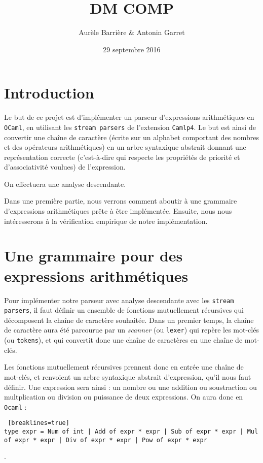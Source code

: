 \documentclass[11pt]{article}
\title{DM COMP}
\author{Aurèle Barrière \& Antonin Garret}
\date{29 septembre 2016}
\begin{document}
\maketitle

\section{Introduction}
Le but de ce projet est d'implémenter un parseur d'expressions arithmétiques en \texttt{OCaml}, en utilisant les \texttt{stream parsers} de l'extension \texttt{Camlp4}. Le but est ainsi de convertir une chaîne de caractère (écrite sur un alphabet comportant des nombres et des opérateurs arithmétiques) en un arbre syntaxique abstrait donnant une représentation correcte (c'est-à-dire qui respecte les propriétés de priorité et d'associativité voulues) de l'expression.

On effectuera une analyse descendante.


Dans une première partie, nous verrons comment aboutir à une grammaire d'expressions arithmétiques prête à être implémentée. Ensuite, nous nous intéresserons à la vérification empirique de notre implémentation.

\section{Une grammaire pour des expressions arithmétiques}

Pour implémenter notre parseur avec analyse descendante avec les \texttt{stream parsers}, il faut définir un ensemble de fonctions mutuellement récursives qui décomposent la chaîne de caractère souhaitée. Dans un premier temps, la chaîne de caractère aura été parcourue par un \textit{scanner} (ou \texttt{lexer}) qui repère les mot-clés (ou \texttt{tokens}), et qui convertit donc une chaîne de caractères en une chaîne de mot-clés.

Les fonctions mutuellement récursives prennent donc en entrée une chaîne de mot-clés, et renvoient un arbre syntaxique abstrait d'expression, qu'il nous faut définir. Une expression sera ainsi : un nombre ou une addition ou soustraction ou multplication ou division ou puissance de deux expressions. On aura donc en \texttt{Ocaml} : 
\begin{lstlisting} [breaklines=true]
type expr = Num of int | Add of expr * expr | Sub of expr * expr | Mul of expr * expr | Div of expr * expr | Pow of expr * expr 
\end{lstlisting}.
\end{document}
